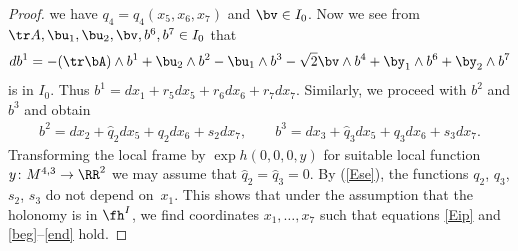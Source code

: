 \begin{proof}
we have $q_4=q_4(x_5,x_6,x_7)$ and $\bv\in I_0$. Now we see from $\tr A, \bu_1, \bu_2, \bv, b^6, b^7 \in I_0$ that
\begin{gather*}db^1=-(\tr \bA)\wedge b^1 +\bu_2\wedge b^2-\bu_1\wedge b^3-\sqrt 2 \bv\wedge b^4+\by_1\wedge b^6 +\by_2\wedge b^7\end{gather*}
is in $I_0$. Thus $b^1=dx_1+ r_5 dx_5+ r_6 dx_6+r_7dx_7$. Similarly, we proceed with $b^2$ and $b^3$ and obtain
\begin{gather*}b^2=dx_2+\hat q_2dx_5+q_2 dx_6+s_2dx_7, \qquad b^3=dx_3+\hat q_3 dx_5 +q_3 dx_6+s_3dx_7.\end{gather*}
Transforming the local frame by $\exp h(0,0,0,y)$ for suitable local function $y\colon M^{4,3}\to \RR^2$ we may assume that $\hat q_{2}=\hat q_{3}=0$. By (\ref{Ese}), the functions $q_2$, $q_3$, $s_2$, $s_3$ do not depend on~$x_1$. This shows that under the assumption that the holonomy is in $\fh^I$, we find coordinates $x_1,\dots,x_7$ such that equations \eqref{Eip} and \eqref{beg}--\eqref{end} hold.


\end{proof}
